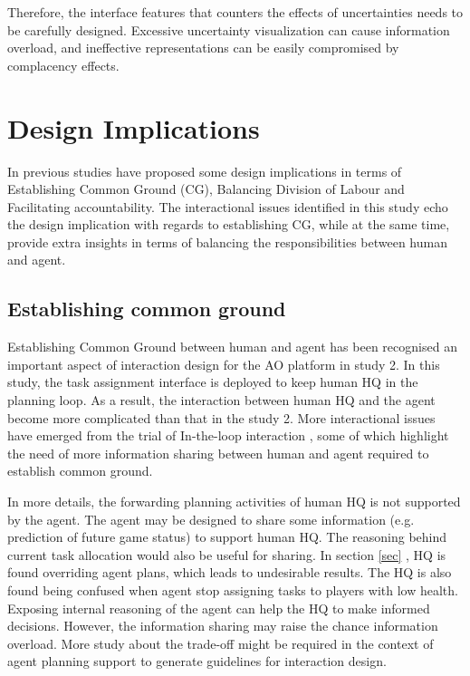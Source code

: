 Therefore, the interface features that counters the effects of uncertainties needs to be carefully designed. Excessive uncertainty visualization can cause information overload, and ineffective representations can be easily compromised by complacency effects. \\





\section{Design Implications}
In previous studies have proposed some design implications in terms of Establishing Common Ground (CG), Balancing Division of Labour and Facilitating accountability. The interactional issues identified in this study echo the design implication with regards to establishing CG, while at the same time, provide extra insights in terms of balancing the responsibilities between human and agent.\\

\subsection{Establishing common ground}

Establishing Common Ground between human and agent has been recognised an important aspect of interaction design for the AO platform in study 2. In this study, the task assignment interface is deployed to keep human HQ in the planning loop. As a result, the interaction between human HQ and the agent become more complicated than that in the study 2. More interactional issues have emerged from the trial of In-the-loop interaction , some of which highlight the need of more information sharing between human and agent required to establish common ground. 

In more details, the forwarding planning activities of human HQ is not supported by the agent. The agent may be designed to share some information (e.g. prediction of future game status) to support human HQ.  The reasoning behind current task allocation would also be useful for sharing. In section \ref{sec} , HQ is found overriding agent plans, which leads to undesirable results. The HQ is also found being confused when agent stop assigning tasks to players with low health. Exposing internal reasoning of the agent can help the HQ to make informed decisions. However, the information sharing may raise the chance information overload. More study about the trade-off might be required in the context of agent planning support to generate guidelines for interaction design. \\

